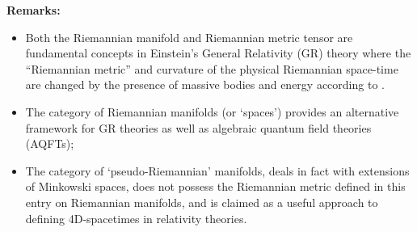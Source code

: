 \documentclass[12pt]{article}
\begin{document}
\textbf{Remarks:}
\begin{itemize}

\item Both the Riemannian manifold and Riemannian metric tensor are fundamental concepts
in Einstein's General Relativity (GR) theory where the ``Riemannian metric'' and curvature of the
physical Riemannian space-time are changed by the presence of massive bodies and energy
according to . 
\item The category of Riemannian manifolds (or `spaces') provides an alternative framework for GR theories
as well as algebraic quantum field theories (AQFTs);
\item The category of `pseudo-Riemannian' manifolds, deals in fact with extensions of Minkowski spaces, does not
possess the Riemannian metric defined in this entry on Riemannian manifolds, and is claimed as a useful
approach to defining 4D-spacetimes in relativity theories.

\end{itemize}
\end{document}
